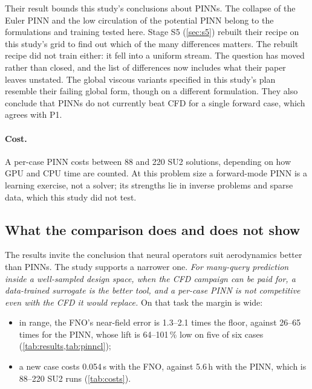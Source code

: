 \documentclass[11pt]{article}
\begin{document}
Their result bounds this study's conclusions about PINNs. The collapse of the Euler PINN and the
low circulation of the potential PINN belong to the formulations and training tested here. Stage
S5 (\cref{sec:s5}) rebuilt their recipe on this study's grid to find out which of the many
differences matters. The rebuilt recipe did not train either: it fell into a uniform stream. The
question has moved rather than closed, and the list of differences now includes what their paper
leaves unstated. The global viscous variants specified in this study's
plan resemble their failing global form, though on a different formulation. They also conclude
that PINNs do not currently beat CFD for a single forward case, which agrees with P1.

\paragraph{Cost.}
A per-case PINN costs between 88 and 220 SU2 solutions, depending on how GPU and CPU time are
counted. At this problem size a forward-mode PINN is a learning exercise, not a solver; its
strengths lie in inverse problems and sparse data, which this study did not test.

\subsection{What the comparison does and does not show}
\label{sec:scope}

The results invite the conclusion that neural operators suit aerodynamics better than PINNs. The
study supports a narrower one. \emph{For many-query prediction inside a well-sampled design space,
when the CFD campaign can be paid for, a data-trained surrogate is the better tool, and a per-case
PINN is not competitive even with the CFD it would replace.} On that task the margin is wide:
\begin{itemize}
  \item in range, the FNO's near-field error is 1.3--2.1 times the floor, against 26--65 times for
    the PINN, whose lift is 64--101\,\% low on five of six cases (\cref{tab:results,tab:pinncl});
  \item a new case costs 0.054\,s with the FNO, against 5.6\,h with the PINN, which is 88--220 SU2
    runs (\cref{tab:costs}).
\end{itemize}
\end{document}
